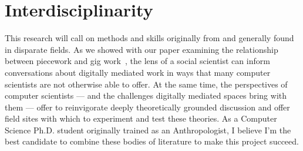 \documentclass{article}
\newcommand{\topic}[1]{{\color{Blue}#1}}
\begin{document}
\section*{Interdisciplinarity}
\topic{This research will call on methods and skills originally from and generally found in disparate fields.}
As we showed with our paper examining the relationship between piecework and gig work~\cite{pieceworkCrowdworkGigwork},
the lens of a social scientist can inform conversations about digitally mediated work in ways that many computer scientists are not otherwise able to offer.
At the same time, the perspectives of computer scientists
--- and the challenges digitally mediated spaces bring with them ---
offer to reinvigorate deeply theoretically grounded discussion and offer field sites with which to experiment and test these theories.
As a Computer Science Ph.D. student originally trained as an Anthropologist, I believe
I'm the best candidate to combine these bodies of literature to make this project succeed.

\begin{comment}
In order to design a system that empowers workers,
a researchers must first attempt to understand a wide range of workers' circumstances:
The needs of workers;
the contexts in which they work;
their relationships with one another, with other groups, \& with institutions such as governments;
and more generally the paradigmatic views of gig workers.
Only then can one reasonably hope to design a system consistent with the views and broader culture of gig work.
\end{comment}

\begin{comment}
\citeauthor{uberAlgorithm} and \citeauthor{crowdcollab} have identified a number of ways that workers subvert and circumvent the intents of system--designers,
both in digital workplaces and where work is simply mediated digitally~\cite{uberAlgorithm,crowdcollab}.
These patterns of behavior elude algorithmic tracking and measurement because they deliberately avoid the \textit{a priori} assumptions made by the designers of systems,
who attempt to structure these sites of work in ways to create incentives for preferred behavior.
Identifying and understanding the details of this behavior thus begins with a qualitative,
ethnographic endeavor.
\end{comment}
\end{document}
